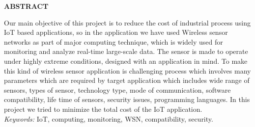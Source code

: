 \newpage
\newpage
{}
\begin{center}
{\large \bf ABSTRACT}
\end{center}
Our main objective of this project is to reduce the cost of industrial process using IoT based applications, so in the application we have used Wireless sensor networks as part of major computing technique, which is widely used for monitoring and analyze real-time large-scale data. The sensor is made to operate under highly extreme conditions, designed with an application in mind. To make this kind of wireless sensor application is challenging process which involves many parameters which are required by target application which includes wide range of sensors, types of sensor, technology type, mode of communication, software compatibility, life time of sensors, security issues, programming languages. In this project we tried to minimize the total cost of the IoT application.  \\

{\it Keywords:} IoT, computing, monitoring, WSN, compatibility, security.

